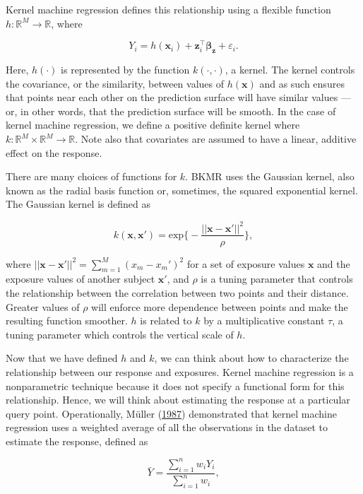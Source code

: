 \documentclass[12pt, twoside]{amherstthesis}
\begin{document}
Kernel machine regression defines this relationship using a flexible function \(h: \mathbb{R}^M \rightarrow \mathbb{R}\), where

\[
Y_i = h(\textbf{x}_i) + \textbf{z}_i^\top \boldsymbol{\beta}_{\textbf{z}} + \varepsilon_i.
\]

\noindent Here, \(h(\cdot)\) is represented by the function \(k(\cdot, \cdot)\), a kernel. The kernel controls the covariance, or the similarity, between values of \(h(\textbf{x})\) and as such ensures that points near each other on the prediction surface will have similar values --- or, in other words, that the prediction surface will be smooth. In the case of kernel machine regression, we define a positive definite kernel where \(k: \mathbb{R}^M\times \mathbb{R}^M \rightarrow \mathbb{R}\). Note also that covariates are assumed to have a linear, additive effect on the response.

There are many choices of functions for \(k\). BKMR uses the Gaussian kernel, also known as the radial basis function or, sometimes, the squared exponential kernel. The Gaussian kernel is defined as

\[
k(\textbf{x}, \textbf{x}') = \textrm{exp}\bigg\{
-\frac{||\textbf{x}-\textbf{x}'||^2}{\rho} \bigg\},
\]

\noindent where \(||\textbf{x}-\textbf{x}'||^2 = \sum_{m=1}^M{(x_{m}-x_{m}')^2}\) for a set of exposure values \(\textbf{x}\) and the exposure values of another subject \(\textbf{x}'\), and \(\rho\) is a tuning parameter that controls the relationship between the correlation between two points and their distance. Greater values of \(\rho\) will enforce more dependence between points and make the resulting function smoother. \(h\) is related to \(k\) by a multiplicative constant \(\tau\), a tuning parameter which controls the vertical scale of \(h\).

Now that we have defined \(h\) and \(k\), we can think about how to characterize the relationship between our response and exposures. Kernel machine regression is a nonparametric technique because it does not specify a functional form for this relationship. Hence, we will think about estimating the response at a particular query point. Operationally, Müller (\protect\hyperlink{ref-muller_weighted_1987}{1987}) demonstrated that kernel machine regression uses a weighted average of all the observations in the dataset to estimate the response, defined as

\[
\bar{Y} = \frac{\sum_{i=1}^nw_iY_i}{\sum_{i=1}^nw_i},
\]
\end{document}
